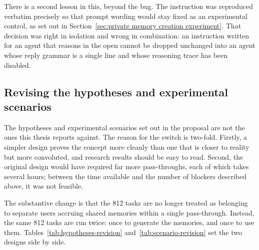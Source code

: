 There is a second lesson in this, beyond the bug. The instruction was reproduced verbatim precisely so that prompt wording would stay fixed as an experimental control, as set out in Section~\ref{sec:private memory creation experiment}. That decision was right in isolation and wrong in combination: an instruction written for an agent that reasons in the open cannot be dropped unchanged into an agent whose reply grammar is a single line and whose reasoning trace has been disabled.

\subsection{Revising the hypotheses and experimental scenarios}

The hypotheses and experimental scenarios set out in the proposal are not the ones this thesis reports against. The reason for the switch is two-fold. Firstly, a simpler design proves the concept more cleanly than one that is closer to reality but more convoluted, and research results should be easy to read. Second, the original design would have required far more pass-throughs, each of which takes several hours; between the time available and the number of blockers described above, it was not feasible.

The substantive change is that the 812 tasks are no longer treated as belonging to separate users accruing shared memories within a single pass-through. Instead, the same 812 tasks are run twice: once to generate the memories, and once to use them. Tables~\ref{tab:hypotheses-revision} and~\ref{tab:scenario-revision} set the two designs side by side.

